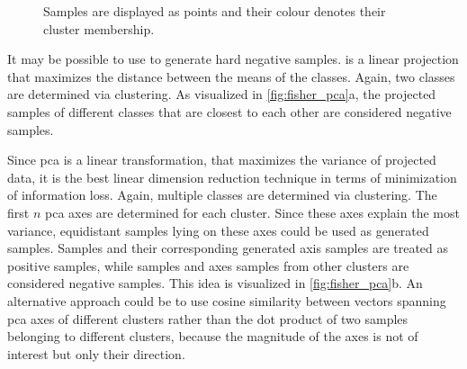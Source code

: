 \begin{figure}[!htb]%
    \centering
    \qquad
    \caption{Samples are displayed as points and their colour denotes their cluster membership.}%
    \label{fig:fisher_pca}%
\end{figure}

It may be possible to use \fisher{} to generate hard negative samples.
\fisher{} is a linear projection that maximizes the distance between the means of the classes.
Again, two classes are determined via clustering.
As visualized in \autoref{fig:fisher_pca}a, the projected samples of different classes that 
are closest to each other are considered negative samples.

Since \ac{pca} is a linear transformation, that maximizes the variance of projected data, 
it is the best linear dimension reduction technique in terms of minimization of information loss.
Again, multiple classes are determined via clustering.
The first $n$ \ac{pca} axes are determined for each cluster.
Since these axes explain the most variance, equidistant samples lying on these axes could be used as generated samples.
Samples and their corresponding generated axis samples are treated as positive samples, 
while samples and axes samples from other clusters are considered negative samples.
This idea is visualized in \autoref{fig:fisher_pca}b.
An alternative approach could be to use cosine similarity between vectors spanning \ac{pca} axes of different clusters 
rather than the dot product of two samples belonging to different clusters, 
because the magnitude of the axes is not of interest but only their direction.

